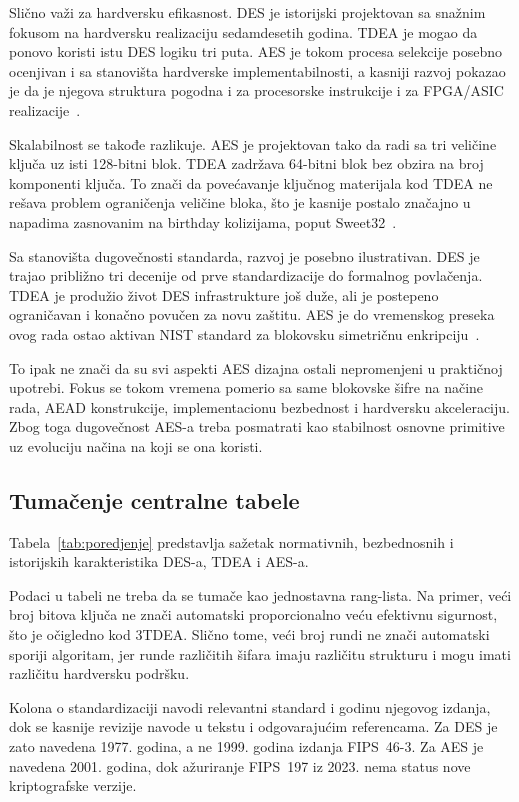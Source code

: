 Slično važi za hardversku efikasnost. DES je istorijski projektovan
sa snažnim fokusom na hardversku realizaciju sedamdesetih godina.
TDEA je mogao da ponovo koristi istu DES logiku tri puta. AES je tokom
procesa selekcije posebno ocenjivan i sa stanovišta hardverske
implementabilnosti, a kasniji razvoj pokazao je da je njegova
struktura pogodna i za procesorske instrukcije i za FPGA/ASIC
realizacije~\cite{nist-aes-report-2001}.

Skalabilnost se takođe razlikuje. AES je projektovan tako da radi sa
tri veličine ključa uz isti 128-bitni blok. TDEA zadržava 64-bitni blok
bez obzira na broj komponenti ključa. To znači da povećavanje ključnog
materijala kod TDEA ne rešava problem ograničenja veličine bloka,
što je kasnije postalo značajno u napadima zasnovanim na birthday
kolizijama, poput Sweet32~\cite{sweet32-2016}.

Sa stanovišta dugovečnosti standarda, razvoj je posebno ilustrativan.
DES je trajao približno tri decenije od prve standardizacije do
formalnog povlačenja. TDEA je produžio život DES infrastrukture još
duže, ali je postepeno ograničavan i konačno povučen za novu zaštitu.
AES je do vremenskog preseka ovog rada ostao aktivan NIST standard
za blokovsku simetričnu enkripciju~\cite{fips197-2023}.

To ipak ne znači da su svi aspekti AES dizajna ostali nepromenjeni u
praktičnoj upotrebi. Fokus se tokom vremena pomerio sa same blokovske
šifre na načine rada, AEAD konstrukcije, implementacionu bezbednost i
hardversku akceleraciju. Zbog toga dugovečnost AES-a treba posmatrati
kao stabilnost osnovne primitive uz evoluciju načina na koji se ona
koristi.


\subsection{Tumačenje centralne tabele}
\label{subsec:poredjenje_tabela}

Tabela~\ref{tab:poredjenje} predstavlja sažetak normativnih,
bezbednosnih i istorijskih karakteristika DES-a, TDEA i AES-a.

Podaci u tabeli ne treba da se tumače kao jednostavna rang-lista.
Na primer, veći broj bitova ključa ne znači automatski proporcionalno
veću efektivnu sigurnost, što je očigledno kod 3TDEA. Slično tome,
veći broj rundi ne znači automatski sporiji algoritam, jer runde
različitih šifara imaju različitu strukturu i mogu imati različitu
hardversku podršku.

Kolona o standardizaciji navodi relevantni standard i godinu njegovog izdanja,
dok se kasnije revizije navode u tekstu i odgovarajućim referencama.
Za DES je zato navedena 1977. godina, a ne 1999. godina izdanja
FIPS~46-3. Za AES je navedena 2001. godina, dok ažuriranje FIPS~197 iz
2023. nema status nove kriptografske verzije.

